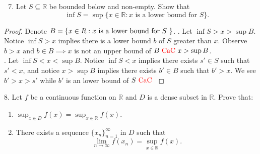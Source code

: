 \documentclass{report}
\begin{document}
\begin{question}{}{}
\begin{enumerate}
    \setcounter{enumi}{6}
    \item Let \( S \subseteq \mathbb{R} \) be bounded below and non-empty. Show that
    \[ \inf S = \sup\{ x \in \mathbb{R} : x \text{ is a lower bound for } S \}. \]
\end{enumerate}
\end{question}
\begin{proof}
Denote $B=\{ x\in R: x\text{ is a lower bound for $S$ } \}$. . Let $\inf S>x>\sup B$. Notice $\inf S>x$ implies there is a lower bound  $b$ of  $S$ greater than  $x$. Observe $b>x\text{ and }b \in B\implies x$ is not an upper bound of $B\text{ \textcolor{red}{CaC} } x>\sup B$.\\

. Let $\inf S<x<\sup B$. Notice $\inf S<x$ implies there exists $s' \in S$ such that $s'<x$, and notice $x> \sup B$ implies there exists $b'\in B$ such that $b'>x$. We see  $b'>x>s'$ while  $b'$ is an lower bound of  $S\text{ \textcolor{red}{CaC} }$
\end{proof}
\begin{question}{}{}
8. Let \( f \) be a continuous function on \( \mathbb{R} \) and \( D \) is a dense subset in \( \mathbb{R} \). Prove that:
\begin{enumerate}
    \item \( \sup_{x \in D} f(x) = \sup_{x \in \mathbb{R}} f(x) \).
    \item There exists a sequence \( \{x_n\}_{n=1}^{\infty} \) in \( D \) such that 
    \[
    \lim_{n \to \infty} f(x_n) = \sup_{x \in \mathbb{R}} f(x).
    \]
\end{enumerate}
\end{question}
\end{document}
